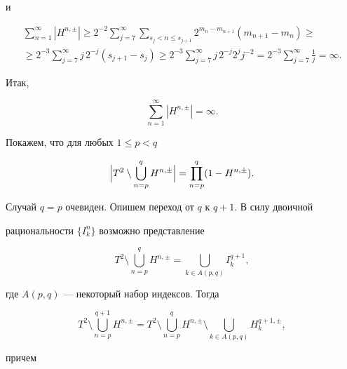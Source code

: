 и


\begin{multline*}


\sum^\infty_{n=1}|H^{n,\pm}|\ge 2^{-2}\sum^\infty_{j=7}


\sum_{s_j<n\le s_{j+1}}2^{m_n-m_{n+1}}(m_{n+1}-m_n)\ge \\


\ge 2^{-3}\sum^\infty_{j=7}j\,2^{-j}(s_{j+1}-s_j)\ge


2^{-3}\sum^\infty_{j=7}j\,2^{-j}2^j j^{-2}=


2^{-3}\sum^\infty_{j=7}\frac{1}{j}=\infty.


\end{multline*}


Итак,


\begin{equation}


\sum^\infty_{n=1}|H^{n,\pm}|=\infty.


\end{equation}





Покажем, что для любых $1\le p<q$


\begin{equation}


\Bigl|T^2\setminus\bigcup^q_{n=p}H^{n,\pm}\Bigr|=


\prod^q_{n=p}(1-H^{n,\pm}).


\end{equation}


Случай $q=p$ очевиден. Опишем переход от $q$ к $q+1$. В силу двоичной


рациональности $\{I^n_k\}$ возможно представление


\begin{equation}


T^2\setminus\bigcup^q_{n=p}H^{n,\pm}=


\bigcup_{k\in A(p,q)}I^{q+1}_k,


\end{equation}


где $A(p,q)$ --- некоторый набор индексов. Тогда


$$


T^2\setminus\bigcup^{q+1}_{n=p}H^{n,\pm}=


T^2\setminus\bigcup^q_{n=p}H^{n,\pm}\setminus


\bigcup_{k\in A(p,q)}H^{q+1,\pm}_k,


$$


причем


